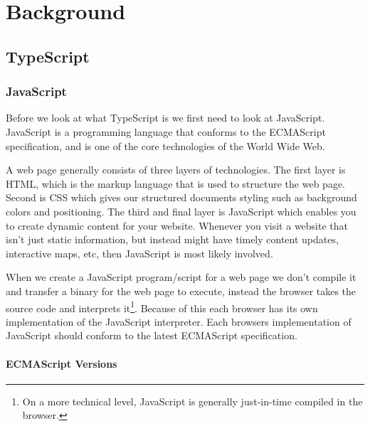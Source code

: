 
\chapter{Background}\label{ch:background}



\section{TypeScript}\label{sec:typescript}

\subsection{JavaScript}\label{subsec:javascript}


Before we look at what TypeScript is we first need to look at JavaScript.
JavaScript is a programming language that conforms to the ECMAScript specification, and is one of the core technologies of the World Wide Web\cite{jswikipedia}.

A web page generally consists of three layers of technologies.
The first layer is HTML, which is the markup language that is used to structure the web page.
Second is CSS which gives our structured documents styling such as background colors and positioning.
The third and final layer is JavaScript which enables you to create dynamic content for your website.
Whenever you visit a website that isn't just static information, but instead might have timely content updates, interactive maps, etc, then JavaScript is most likely involved\cite{whatisjs}.

When we create a JavaScript program/script for a web page we don't compile it and transfer a binary for the web page to execute, instead the browser takes the source code and interprets it\footnote{On a more technical level, JavaScript is generally just-in-time compiled in the browser.}.
Because of this each browser has its own implementation of the JavaScript interpreter.
Each browsers implementation of JavaScript should conform to the latest ECMAScript specification.

\subsubsection{ECMAScript Versions}

